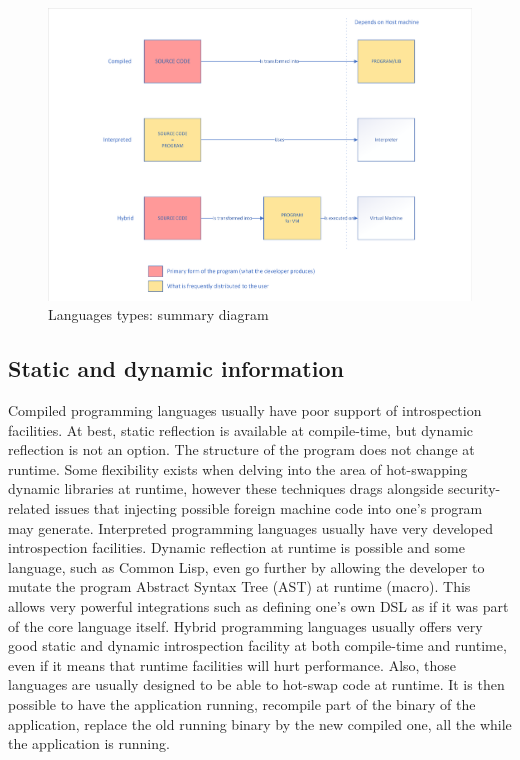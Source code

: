 \begin{figure}[htbp]
  \centering
  \includegraphics[width=.9\linewidth]{../figures/comp_inter_hybrid_summary}
  \caption{Languages types: summary diagram}
  \label{fig:static.dynamic.summary.pipeline}
\end{figure}

\subsection{Static and dynamic information}

Compiled programming languages usually have poor support of introspection facilities. At best, static reflection is
available at compile-time, but dynamic reflection is not an option. The structure of the program does not change at
runtime. Some flexibility exists when delving into the area of hot-swapping dynamic libraries at runtime, however these
techniques drags alongside security-related issues that injecting possible foreign machine code into one's program may
generate.
Interpreted programming languages usually have very developed introspection facilities. Dynamic reflection at
runtime is possible and some language, such as Common Lisp, even go further by allowing the developer to mutate the
program Abstract Syntax Tree (AST) at runtime (macro). This allows very powerful integrations such as defining one's own
DSL as if it was part of the core language itself.
Hybrid programming languages usually offers very good static and dynamic introspection facility at both compile-time and
runtime, even if it means that runtime facilities will hurt performance. Also, those languages are usually designed to
be able to hot-swap code at runtime. It is then possible to have the application running, recompile part of the binary
of the application, replace the old running binary by the new compiled one, all the while the application is running.

